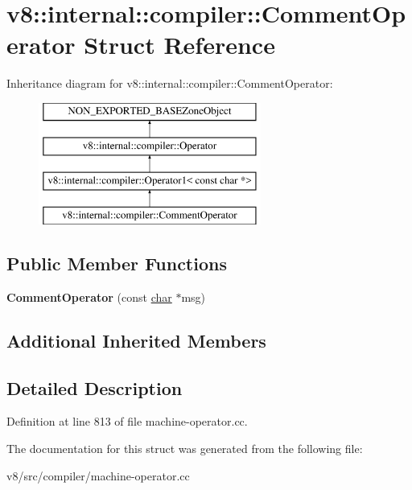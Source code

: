 \hypertarget{structv8_1_1internal_1_1compiler_1_1CommentOperator}{}\section{v8\+:\+:internal\+:\+:compiler\+:\+:Comment\+Operator Struct Reference}
\label{structv8_1_1internal_1_1compiler_1_1CommentOperator}
Inheritance diagram for v8\+:\+:internal\+:\+:compiler\+:\+:Comment\+Operator\+:\begin{figure}[H]
\begin{center}
\leavevmode
\includegraphics[height=4.000000cm]{structv8_1_1internal_1_1compiler_1_1CommentOperator}
\end{center}
\end{figure}
\subsection*{Public Member Functions}
\begin{DoxyCompactItemize}
\item 
\mbox{\label{structv8_1_1internal_1_1compiler_1_1CommentOperator_ad9711493883bceca118dd32a1490b0cb}} 
{\bfseries Comment\+Operator} (const \mbox{\hyperlink{classchar}{char}} $\ast$msg)
\end{DoxyCompactItemize}
\subsection*{Additional Inherited Members}


\subsection{Detailed Description}


Definition at line 813 of file machine-\/operator.\+cc.



The documentation for this struct was generated from the following file\+:\begin{DoxyCompactItemize}
\item 
v8/src/compiler/machine-\/operator.\+cc\end{DoxyCompactItemize}
